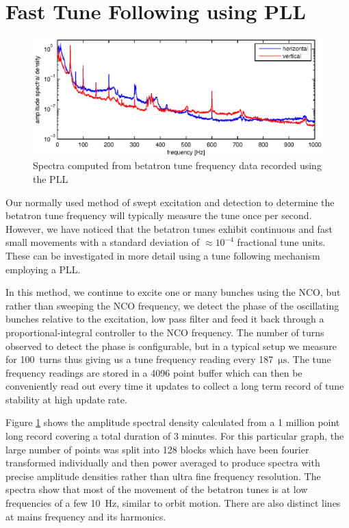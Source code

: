 \documentclass[a4paper]{jacow}
\begin{document}
\section{Fast Tune Following using PLL}
\begin{figure}%
\includegraphics[width=\linewidth]{WEPD24_f4.eps}
\caption{Spectra computed from betatron tune frequency data recorded using the PLL}
\label{tunespectra}
\end{figure}

Our normally used method of swept excitation and detection to determine the betatron tune frequency \cite{status} will typically measure the tune once per second. However, we have noticed that the betatron tunes exhibit continuous and fast small movements with a standard deviation of $\approx10^{-4}$ fractional tune units. These can be investigated in more detail using a tune following mechanism employing a PLL.

In this method, we continue to excite one or many bunches using the NCO, but rather than sweeping the NCO frequency, we detect the phase of the oscillating bunches relative to the excitation, low pass filter and feed it back through a proportional-integral controller to the NCO frequency. The number of turns observed to detect the phase is configurable, but in a typical setup we measure for 100~turns thus giving us a tune frequency reading every 187~$\mathrm{\mu s}$. The tune frequency readings are stored in a 4096 point buffer which can then be conveniently read out every time it updates to collect a long term record of tune stability at high update rate.

Figure \ref{tunespectra} shows the amplitude spectral density calculated from a 1 million point long record covering a total duration of 3 minutes. For this particular graph, the large number of points was split into 128 blocks which have been fourier transformed individually and then power averaged to produce spectra with precise amplitude densities rather than ultra fine frequency resolution. The spectra show that most of the movement of the betatron tunes is at low frequencies of a few 10~Hz, similar to orbit motion. There are also distinct lines at mains frequency and its harmonics.
\end{document}
